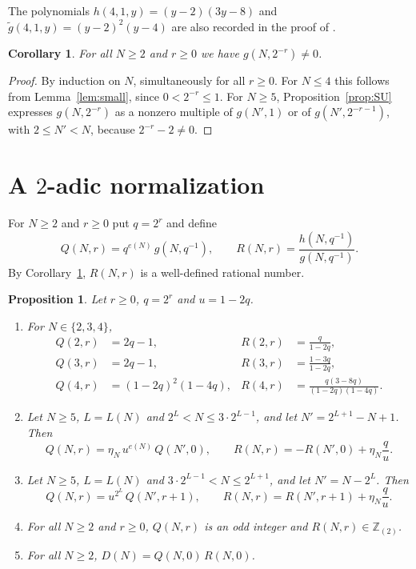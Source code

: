 \documentclass{amsart}
\newtheorem{proposition}[theorem]{Proposition}
\newtheorem{corollary}[theorem]{Corollary}
\theoremstyle{definition}
\theoremstyle{remark}
\numberwithin{equation}{section}
\newcommand{\Zt}{\mathbb{Z}_{(2)}}
\begin{document}
The polynomials $h(4,1,y)=(y-2)(3y-8)$ and $\tilde g(4,1,y)=(y-2)^2(y-4)$ are also recorded in the proof of \cite[Proposition~4.5]{SU}.

\begin{corollary}\label{cor:nonzero}
For all $N\ge2$ and $r\ge0$ we have $g(N,2^{-r})\ne0$.
\end{corollary}

\begin{proof}
By induction on $N$, simultaneously for all $r\ge0$. For $N\le4$ this follows from Lemma~\ref{lem:small}, since $0<2^{-r}\le1$. For $N\ge5$, Proposition~\ref{prop:SU} expresses $g(N,2^{-r})$ as a nonzero multiple of $g(N',1)$ or of $g(N',2^{-r-1})$, with $2\le N'<N$, because $2^{-r}-2\ne0$.
\end{proof}

\section{A \texorpdfstring{$2$}{2}-adic normalization}\label{sec:normalization}

For $N\ge2$ and $r\ge0$ put $q=2^r$ and define
\[
Q(N,r)=q^{e(N)}\,g(N,q^{-1}),\qquad R(N,r)=\frac{h(N,q^{-1})}{g(N,q^{-1})}.
\]
By Corollary~\ref{cor:nonzero}, $R(N,r)$ is a well-defined rational number.

\begin{proposition}\label{prop:normalized}
Let $r\ge0$, $q=2^r$ and $u=1-2q$.
\begin{enumerate}
\item[(i)] For $N\in\{2,3,4\}$,
\begin{equation}\label{eq:terminal}
\begin{aligned}
Q(2,r)&=2q-1, & R(2,r)&=\frac{q}{1-2q},\\
Q(3,r)&=2q-1, & R(3,r)&=\frac{1-3q}{1-2q},\\
Q(4,r)&=(1-2q)^2(1-4q), & R(4,r)&=\frac{q(3-8q)}{(1-2q)(1-4q)}.
\end{aligned}
\end{equation}
\item[(ii)] Let $N\ge5$, $L=L(N)$ and $2^L<N\le3\cdot2^{L-1}$, and let $N'=2^{L+1}-N+1$. Then
\begin{equation}\label{eq:lower}
Q(N,r)=\eta_N\,u^{e(N)}\,Q(N',0),\qquad R(N,r)=-R(N',0)+\eta_N\frac{q}{u}.
\end{equation}
\item[(iii)] Let $N\ge5$, $L=L(N)$ and $3\cdot2^{L-1}<N\le2^{L+1}$, and let $N'=N-2^L$. Then
\begin{equation}\label{eq:upper}
Q(N,r)=u^{2^L}\,Q(N',r+1),\qquad R(N,r)=R(N',r+1)+\eta_N\frac{q}{u}.
\end{equation}
\item[(iv)] For all $N\ge2$ and $r\ge0$, $Q(N,r)$ is an odd integer and $R(N,r)\in\Zt$.
\item[(v)] For all $N\ge2$, $D(N)=Q(N,0)\,R(N,0)$.
\end{enumerate}
\end{proposition}
\end{document}
